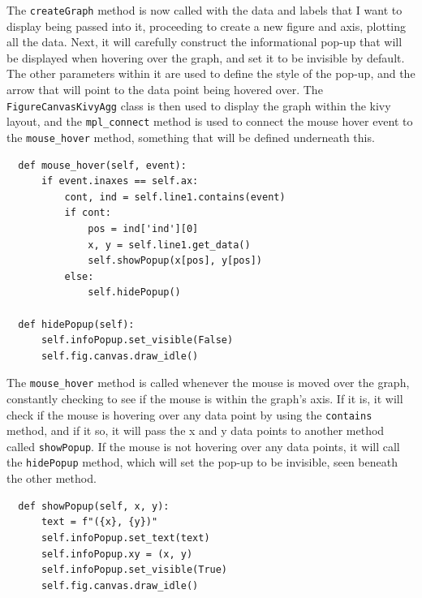 \documentclass{article}
\begin{document}
\vspace{0.3cm}
The \texttt{createGraph} method is now called with the data and labels that I want to display being passed into it, proceeding to create a new figure and axis, plotting all the data. Next, it will carefully construct the informational pop-up that will be displayed when hovering over the graph, and set it to be invisible by default. The other parameters within it are used to define the style of the pop-up, and the arrow that will point to the data point being hovered over. The \texttt{FigureCanvasKivyAgg} class is then used to display the graph within the kivy layout, and the \texttt{mpl\_connect} method is used to connect the mouse hover event to the \texttt{mouse\_hover} method, something that will be defined underneath this.\\\vspace{0.3cm}

\begin{verbatim}
  def mouse_hover(self, event):
      if event.inaxes == self.ax:
          cont, ind = self.line1.contains(event)
          if cont:
              pos = ind['ind'][0]
              x, y = self.line1.get_data()
              self.showPopup(x[pos], y[pos])
          else:
              self.hidePopup()

  def hidePopup(self):
      self.infoPopup.set_visible(False)
      self.fig.canvas.draw_idle()
\end{verbatim}

\vspace{0.3cm}
The \texttt{mouse\_hover} method is called whenever the mouse is moved over the graph, constantly checking to see if the mouse is within the graph's axis. If it is, it will check if the mouse is hovering over any data point by using the \texttt{contains} method, and if it so, it will pass the x and y data points to another method called \texttt{showPopup}. If the mouse is not hovering over any data points, it will call the \texttt{hidePopup} method, which will set the pop-up to be invisible, seen beneath the other method.\\\vspace{0.3cm}

\begin{verbatim}
  def showPopup(self, x, y):
      text = f"({x}, {y})"
      self.infoPopup.set_text(text)
      self.infoPopup.xy = (x, y)
      self.infoPopup.set_visible(True)
      self.fig.canvas.draw_idle()
\end{verbatim}
\end{document}
